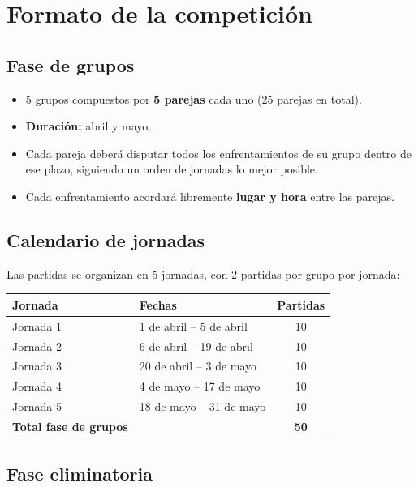 \documentclass[11pt,a4paper]{article}
\begin{document}
\section{Formato de la competición}

\subsection{Fase de grupos}

\begin{itemize}
    \item 5 grupos compuestos por \textbf{5 parejas} cada uno (25 parejas en total).
    \item \textbf{Duración:} abril y mayo.
    \item Cada pareja deberá disputar todos los enfrentamientos de su grupo dentro de ese plazo, siguiendo un orden de jornadas lo mejor posible.
    \item Cada enfrentamiento acordará libremente \textbf{lugar y hora} entre las parejas.
\end{itemize}

\subsection{Calendario de jornadas}

Las partidas se organizan en 5 jornadas, con 2 partidas por grupo por jornada:

\begin{center}
\begin{tabularx}{\textwidth}{lXc}
\toprule
\textbf{Jornada} & \textbf{Fechas} & \textbf{Partidas} \\
\midrule
Jornada 1 & 1 de abril -- 5 de abril & 10 \\
Jornada 2 & 6 de abril -- 19 de abril & 10 \\
Jornada 3 & 20 de abril -- 3 de mayo & 10 \\
Jornada 4 & 4 de mayo -- 17 de mayo & 10 \\
Jornada 5 & 18 de mayo -- 31 de mayo & 10 \\
\midrule
\textbf{Total fase de grupos} & & \textbf{50} \\
\bottomrule
\end{tabularx}
\end{center}

\subsection{Fase eliminatoria}
\end{document}
